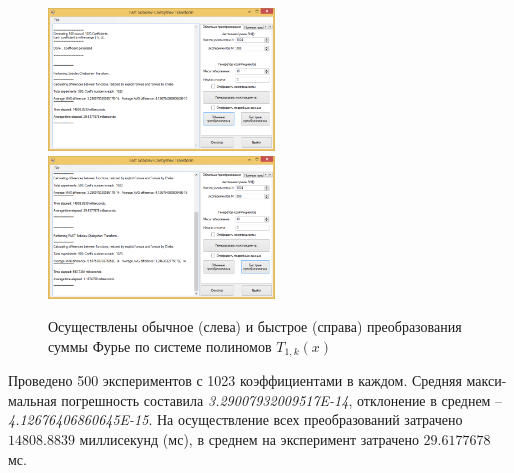 \begin{figure}[H]
	\begin{center}
		\includegraphics[width=170pt]{pictures/sms-stn-1(4)}
		\quad
		\includegraphics[width=170pt]{pictures/sms-stn-1(5)}
		\caption{
			Осуществлены обычное (слева) и быстрое (справа) преобразования суммы Фурье по системе полиномов $T_{1,k}(x)$
		}\label{sms-stn-1-img3}
	\end{center}
\end{figure}

Проведено 500 экспериментов с 1023 коэффициентами в каждом.
Средняя макси-\linebreak мальная погрешность составила \textit{3.29007932009517E-14}, отклонение в среднем -- \linebreak \textit{4.12676406860645E-15}.
На осуществление всех преобразований затрачено $14808.8839$ миллисекунд (мс), в среднем на эксперимент затрачено $29.6177678$ мс.

